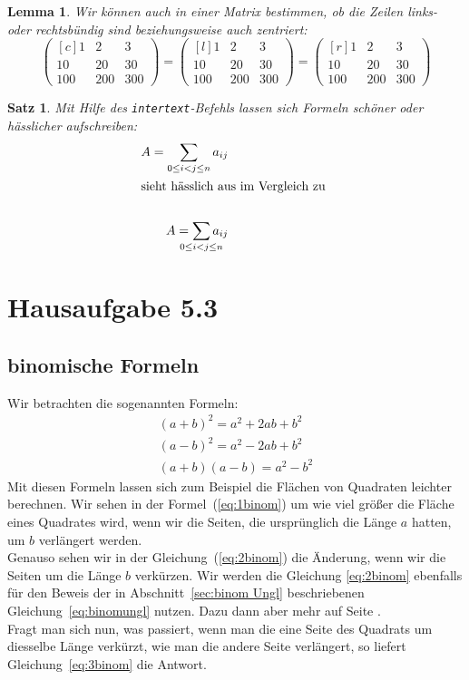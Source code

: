 \documentclass[a4paper]{article}
\newtheorem{lemma}{Lemma}[section]
\newtheorem{satz}{Satz}[subsection]
\begin{document}
\begin{lemma}
Wir können auch in einer Matrix bestimmen, ob die Zeilen links- oder rechtsbündig sind beziehungsweise auch zentriert: 
\[
\begin{pmatrix*}[c]
1 & 2 & 3 \\
10 & 20 & 30 \\
100 & 200 & 300
\end{pmatrix*} = 
\begin{pmatrix*}[l]
1 & 2 & 3 \\
10 & 20 & 30 \\
100 & 200 & 300
\end{pmatrix*}=
\begin{pmatrix*}[r]
1 & 2 & 3 \\
10 & 20 & 30 \\
100 & 200 & 300
\end{pmatrix*}
\]
\end{lemma}

\begin{satz}
Mit Hilfe des \texttt{intertext}-Befehls lassen sich Formeln schöner oder hässlicher aufschreiben: 
\begin{align*}
A = \sum_{0 \leq i < j \leq n} a_{ij} \\
\intertext{sieht hässlich aus im Vergleich zu }\\
A = \sum_{\mathclap{ 0 \leq i < j \leq n}} a_{ij}
\end{align*}
\end{satz}

\newpage
\section{Hausaufgabe 5.3}
\label{sec:HA5.3}
\subsection{binomische Formeln}
\label{sec:binomische Formeln}

Wir betrachten die sogenannten Formeln: 
\begin{align} 
(a + b)^2 = a^2 +2ab + b^2 \label{eq:1binom} \\
(a - b)^2 = a^2 -2ab + b^2 \label{eq:2binom} \\
(a + b)(a - b) = a^2 - b^2 \label{eq:3binom}
\end{align}
Mit diesen Formeln lassen sich zum Beispiel die Flächen von Quadraten leichter berechnen. Wir sehen in der Formel~(\ref{eq:1binom}) um wie viel größer die Fläche eines Quadrates wird, wenn wir die Seiten, die ursprünglich die Länge $a$ hatten, um $b$ verlängert werden. \\
Genauso sehen wir in der Gleichung~(\ref{eq:2binom}) die Änderung, wenn wir die Seiten um die Länge $b$ verkürzen. Wir werden die Gleichung \eqref{eq:2binom} ebenfalls für den Beweis der in Abschnitt~\ref{sec:binom Ungl} beschriebenen Gleichung~\eqref{eq:binomungl} nutzen. Dazu dann aber mehr auf Seite \pageref{sec:HA5.3}. \\
Fragt man sich nun, was passiert, wenn man die eine Seite des Quadrats um diesselbe Länge verkürzt, wie man die andere Seite verlängert, so liefert Gleichung~\eqref{eq:3binom} die Antwort. 
\end{document}
